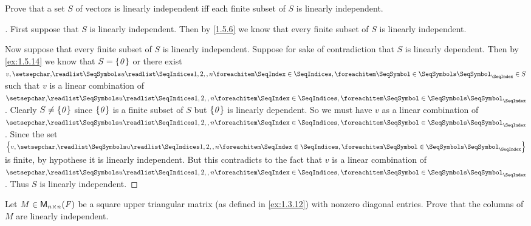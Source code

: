 \begin{ex}\label{ex:1.5.16}
	Prove that a set \(S\) of vectors is linearly independent iff each finite subset of \(S\) is linearly independent.
\end{ex}

\begin{proof}[]
	First suppose that \(S\) is linearly independent.
	Then by \cref{1.5.6} we know that every finite subset of \(S\) is linearly independent.

	Now suppose that every finite subset of \(S\) is linearly independent.
	Suppose for sake of contradiction that \(S\) is linearly dependent.
	Then by \cref{ex:1.5.14} we know that \(S = \left\lbrace\mathit{0}\right\rbrace\) or there exist \(v, \seq{u}{1,2,,n} \in S\) such that \(v\) is a linear combination of \(\seq{u}{1,2,,n}\).
	Clearly \(S \neq \left\lbrace\mathit{0}\right\rbrace\) since \(\left\lbrace\mathit{0}\right\rbrace\) is a finite subset of \(S\) but \(\left\lbrace\mathit{0}\right\rbrace\) is linearly dependent.
	So we must have \(v\) as a linear combination of \(\seq{u}{1,2,,n}\).
	Since the set \(\set{v,\seq{u}{1,2,,n}}\) is finite, by hypothese it is linearly independent.
	But this contradicts to the fact that \(v\) is a linear combination of \(\seq{u}{1,2,,n}\).
	Thus \(S\) is linearly independent.
\end{proof}

\begin{ex}\label{ex:1.5.17}
	Let \(M \in \mathsf{M}_{{n} \times n}({\mathit{F}})\) be a square upper triangular matrix (as defined in \cref{ex:1.3.12}) with nonzero diagonal entries.
	Prove that the columns of \(M\) are linearly independent.
\end{ex}

